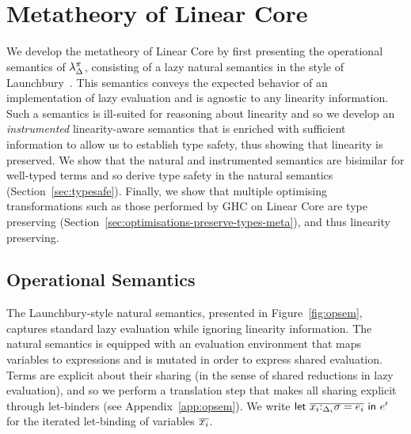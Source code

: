 \documentclass[acmsmall,review,anonymous,screen]{acmart}
\newcommand{\llet}[2]{\mathsf{let}~#1~\mathsf{in}~#2}
\begin{document}
\section{Metatheory of Linear Core\label{sec:main:metatheory}}

We develop the metatheory of Linear Core by first 
presenting the operational semantics of $\lambda^\pi_\Delta$,
consisting of a lazy natural semantics in the
style of Launchbury~\cite{10.1145/158511.158618}.
This semantics conveys the expected behavior of an implementation of
lazy evaluation and is agnostic to any linearity information.
Such a semantics is ill-suited for reasoning about
linearity and so we develop an \emph{instrumented} linearity-aware semantics that is
enriched with sufficient information to allow us to establish type
safety, thus showing that linearity is preserved. We show that the natural
and instrumented semantics are bisimilar for well-typed terms and so
derive type safety in the natural semantics
(Section~\ref{sec:typesafe}). Finally, we show that multiple optimising
transformations such as those performed by GHC on Linear Core are
type preserving
(Section~\ref{sec:optimisations-preserve-types-meta}), and thus
linearity preserving.

\subsection{Operational Semantics}

The Launchbury-style natural semantics, presented in Figure~\ref{fig:opsem}, captures
standard lazy evaluation while ignoring linearity information.
%
The natural semantics is equipped with an evaluation environment that
maps variables to expressions and is
mutated in order to express shared evaluation. Terms are explicit about
their sharing (in the sense of shared reductions in lazy evaluation),
and so we perform a translation step that makes all sharing explicit
through let-binders (see Appendix~\ref{app:opsem}).
We write $\llet{\ov{x_i{:}_{\Delta_i}\sigma = e_i}}{e'}$ for the iterated
let-binding of variables $\overline{x_i}$. 
\end{document}
